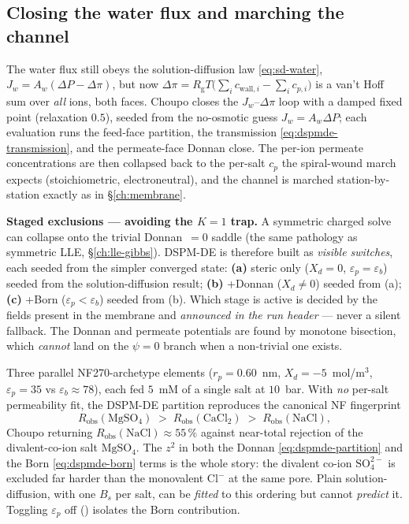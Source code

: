 \documentclass[11pt,a4paper]{article}
\newcommand{\Rgas}{R_{\!\mathrm{g}}}                %
\begin{document}
\subsection{Closing the water flux and marching the channel}

The water flux still obeys the solution-diffusion law
\eqref{eq:sd-water}, $J_w=A_w(\Delta P-\Delta\pi)$, but now
$\Delta\pi=\Rgas T\bigl(\sum_i c_{\text{wall},i}-\sum_i c_{p,i}\bigr)$
is a van't Hoff sum over \emph{all} ions, both faces.  Choupo closes the
$J_w$--$\Delta\pi$ loop with a damped fixed point (relaxation $0.5$),
seeded from the no-osmotic guess $J_w=A_w\Delta P$; each evaluation
runs the feed-face partition, the transmission
\eqref{eq:dspmde-transmission}, and the permeate-face Donnan close.  The
per-ion permeate concentrations are then collapsed back to the per-salt
$c_p$ the spiral-wound march expects (stoichiometric, electroneutral),
and the channel is marched station-by-station exactly as in
\S\ref{ch:membrane}.

\begin{keyidea}
\textbf{Staged exclusions --- avoiding the $K=1$ trap.}  A symmetric
charged solve can collapse onto the trivial Donnan~$=0$ saddle (the same
pathology as symmetric LLE, \S\ref{ch:lle-gibbs}).  DSPM-DE is therefore
built as \emph{visible switches}, each seeded from the simpler converged
state: \textbf{(a)} steric only ($X_d=0$,
$\varepsilon_p=\varepsilon_b$) seeded from the solution-diffusion
result; \textbf{(b)} +Donnan ($X_d\neq0$) seeded from (a); \textbf{(c)}
+Born ($\varepsilon_p<\varepsilon_b$) seeded from (b).  Which stage is
active is decided by the fields present in the membrane  and
\emph{announced in the run header} --- never a silent fallback.  The
Donnan and permeate potentials are found by monotone bisection, which
\emph{cannot} land on the $\psi=0$ branch when a non-trivial one exists.
\end{keyidea}

\begin{example}
Three parallel NF270-archetype elements ($r_p=0.60$~nm,
$X_d=-5$~mol/m$^3$, $\varepsilon_p=35$ vs
$\varepsilon_b\approx78$), each fed $5$~mM of a single salt at
$10$~bar.  With \emph{no} per-salt permeability fit, the DSPM-DE
partition reproduces the canonical NF fingerprint
\[
   R_{\text{obs}}(\mathrm{MgSO_4}) \;>\;
   R_{\text{obs}}(\mathrm{CaCl_2}) \;>\;
   R_{\text{obs}}(\mathrm{NaCl}),
\]
Choupo returning $R_{\text{obs}}(\mathrm{NaCl})\approx 55\,\%$ against
near-total rejection of the divalent-co-ion salt $\mathrm{MgSO_4}$.  The
$z^2$ in both the Donnan \eqref{eq:dspmde-partition} and the Born
\eqref{eq:dspmde-born} terms is the whole story: the divalent co-ion
$\mathrm{SO_4^{2-}}$ is excluded far harder than the monovalent
$\mathrm{Cl^-}$ at the same pore.  Plain solution-diffusion, with one
$B_s$ per salt, can be \emph{fitted} to this ordering but cannot
\emph{predict} it.  Toggling $\varepsilon_p$ off
() isolates the Born
contribution.
\end{example}
\end{document}
